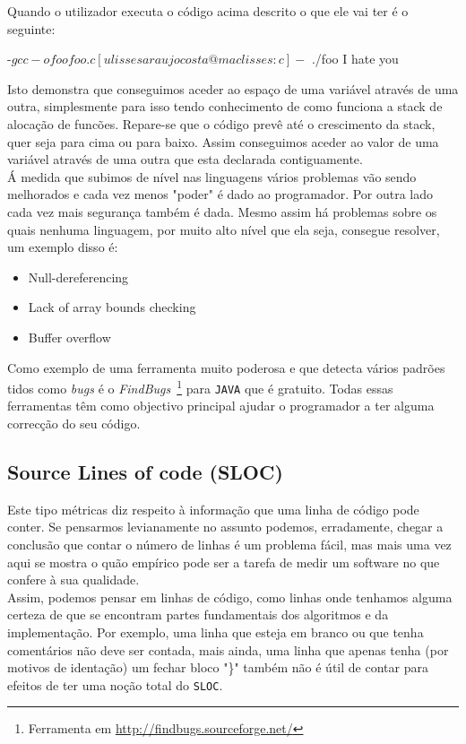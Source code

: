 Quando o utilizador executa o código acima descrito o que ele vai ter é o seguinte:

\begin{code_files}
-$ gcc -o foo foo.c
[ulissesaraujocosta@maclisses:c]-$ ./foo
I hate you
\end{code_files}

Isto demonstra que conseguimos aceder ao espaço de uma variável através de uma outra, simplesmente para isso tendo conhecimento de como funciona a stack de 
alocação de funcões. Repare-se que o código prevê até o crescimento da stack, quer seja para cima ou para baixo. 
Assim conseguimos aceder ao valor de uma variável através de uma outra que esta declarada contiguamente.\\

Á medida que subimos de nível nas linguagens vários problemas vão sendo melhorados e cada vez menos "poder" é dado ao programador. 
Por outra lado cada vez mais segurança também é dada. 
Mesmo assim há problemas sobre os quais nenhuma linguagem, por muito alto nível que ela seja, consegue resolver, um exemplo disso é:

\begin{itemize}
\item Null-dereferencing
\item Lack of array bounds checking
\item Buffer overflow
\end{itemize}

Como exemplo de uma ferramenta muito poderosa e que detecta vários padrões tidos como \emph{bugs} é o 
\emph{FindBugs}~\footnote{Ferramenta em \url{http://findbugs.sourceforge.net/}} para \texttt{JAVA} que é gratuito. 
Todas essas ferramentas têm como objectivo principal ajudar o programador a ter alguma correcção do seu código.

\subsection{Source Lines of code (SLOC)}

Este tipo métricas diz respeito à informação que uma linha de código pode conter. 
Se pensarmos levianamente no assunto podemos, erradamente, chegar a conclusão que contar o número de linhas é um problema fácil, 
mas mais uma vez aqui se mostra o quão empírico pode ser a tarefa de medir um software no que confere à sua qualidade.\\

Assim, podemos pensar em linhas de código, como linhas onde tenhamos alguma certeza de que se encontram partes fundamentais 
dos algoritmos e da implementação. Por exemplo, uma linha que esteja em branco ou que tenha comentários não deve ser contada, 
mais ainda, uma linha que apenas tenha (por motivos de identação) um fechar bloco "\}" também não é útil de contar para efeitos de ter uma noção total do \texttt{SLOC}.\\

